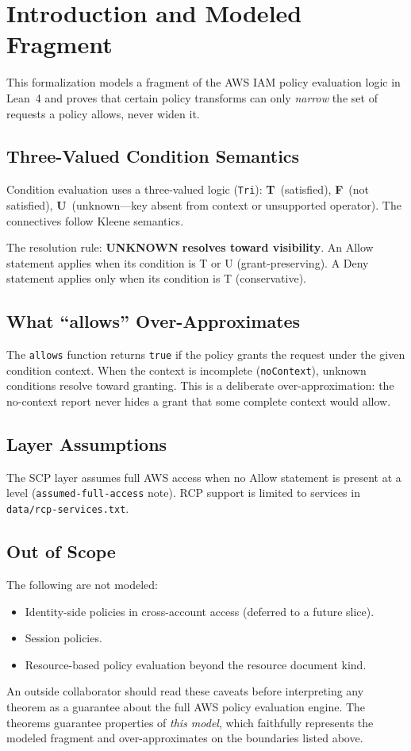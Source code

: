 \chapter{Introduction and Modeled Fragment}\label{chap:intro}

This formalization models a fragment of the AWS IAM policy evaluation
logic in Lean~4 and proves that certain policy transforms can only
\emph{narrow} the set of requests a policy allows, never widen it.

\section{Three-Valued Condition Semantics}

Condition evaluation uses a three-valued logic (\texttt{Tri}):
\textbf{T}~(satisfied), \textbf{F}~(not satisfied),
\textbf{U}~(unknown---key absent from context or unsupported operator).
The connectives follow Kleene semantics.

The resolution rule: \textbf{UNKNOWN resolves toward visibility}.
An Allow statement applies when its condition is T or U (grant-preserving).
A Deny statement applies only when its condition is T (conservative).

\section{What ``allows'' Over-Approximates}

The \texttt{allows} function returns \texttt{true} if the policy
grants the request under the given condition context.  When the context
is incomplete (\texttt{noContext}), unknown conditions resolve toward
granting.  This is a deliberate over-approximation: the no-context
report never hides a grant that some complete context would allow.

\section{Layer Assumptions}

The SCP layer assumes full AWS access when no Allow statement is present
at a level (\texttt{assumed-full-access} note).  RCP support is limited
to services in \texttt{data/rcp-services.txt}.

\section{Out of Scope}

The following are not modeled:
\begin{itemize}
\item Identity-side policies in cross-account access (deferred to a future slice).
\item Session policies.
\item Resource-based policy evaluation beyond the resource document kind.
\end{itemize}

An outside collaborator should read these caveats before interpreting
any theorem as a guarantee about the full AWS policy evaluation engine.
The theorems guarantee properties of \emph{this model}, which faithfully
represents the modeled fragment and over-approximates on the boundaries
listed above.
